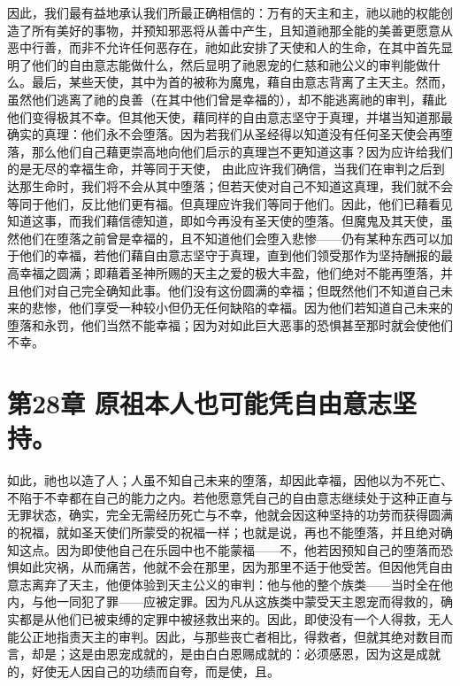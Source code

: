 因此，我们最有益地承认我们所最正确相信的：万有的天主和主，祂以祂的权能创造了所有美好的事物，并预知邪恶将从善中产生，且知道祂那全能的美善更愿意从恶中行善，而非不允许任何恶存在，祂如此安排了天使和人的生命，在其中首先显明了他们的自由意志能做什么，然后显明了祂恩宠的仁慈和祂公义的审判能做什么。最后，某些天使，其中为首的被称为魔鬼，藉自由意志背离了主天主。然而，虽然他们逃离了祂的良善（在其中他们曾是幸福的），却不能逃离祂的审判，藉此他们变得极其不幸。但其他天使，藉同样的自由意志坚守于真理，并堪当知道那最确实的真理：他们永不会堕落。因为若我们从圣经得以知道没有任何圣天使会再堕落，那么他们自己藉更崇高地向他们启示的真理岂不更知道这事？因为应许给我们的是无尽的幸福生命，并等同于天使， 由此应许我们确信，当我们在审判之后到达那生命时，我们将不会从其中堕落；但若天使对自己不知道这真理，我们就不会等同于他们，反比他们更有福。但真理应许我们等同于他们。因此，他们已藉看见知道这事，而我们藉信德知道，即如今再没有圣天使的堕落。但魔鬼及其天使，虽然他们在堕落之前曾是幸福的，且不知道他们会堕入悲惨——仍有某种东西可以加于他们的幸福，若他们藉自由意志坚守于真理，直到他们领受那作为坚持酬报的最高幸福之圆满；即藉着圣神所赐的天主之爱的极大丰盈，他们绝对不能再堕落，并且他们对自己完全确知此事。他们没有这份圆满的幸福；但既然他们不知道自己未来的悲惨，他们享受一种较小但仍无任何缺陷的幸福。因为他们若知道自己未来的堕落和永罚，他们当然不能幸福；因为对如此巨大恶事的恐惧甚至那时就会使他们不幸。\par


\section{第28章 原祖本人也可能凭自由意志坚持。}

如此，祂也以造了人；人虽不知自己未来的堕落，却因此幸福，因他以为不死亡、不陷于不幸都在自己的能力之内。若他愿意凭自己的自由意志继续处于这种正直与无罪状态，确实，完全无需经历死亡与不幸，他就会因这种坚持的功劳而获得圆满的祝福，就如圣天使们所蒙受的祝福一样；也就是说，再也不能堕落，并且绝对确知这点。因为即使他自己在乐园中也不能蒙福——不，他若因预知自己的堕落而恐惧如此灾祸，从而痛苦，他就不会在那里，因为那里不适于他受苦。但因他凭自由意志离弃了天主，他便体验到天主公义的审判：他与他的整个族类——当时全在他内，与他一同犯了罪——应被定罪。因为凡从这族类中蒙受天主恩宠而得救的，确实都是从他们已被束缚的定罪中被拯救出来的。因此，即使没有一个人得救，无人能公正地指责天主的审判。因此，与那些丧亡者相比，得救者，但就其绝对数目而言，却是；这是由恩宠成就的，是由白白恩赐成就的：必须感恩，因为这是成就的，好使无人因自己的功绩而自夸，而是使，且。\par

